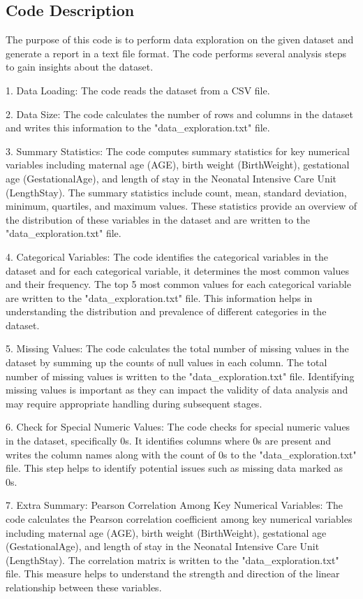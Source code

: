 \documentclass[11pt]{article}
\begin{document}
\subsection{Code Description}

The purpose of this code is to perform data exploration on the given dataset and generate a report in a text file format. The code performs several analysis steps to gain insights about the dataset.

1. Data Loading: The code reads the dataset from a CSV file.

2. Data Size: The code calculates the number of rows and columns in the dataset and writes this information to the "data\_exploration.txt" file.

3. Summary Statistics: The code computes summary statistics for key numerical variables including maternal age (AGE), birth weight (BirthWeight), gestational age (GestationalAge), and length of stay in the Neonatal Intensive Care Unit (LengthStay). The summary statistics include count, mean, standard deviation, minimum, quartiles, and maximum values. These statistics provide an overview of the distribution of these variables in the dataset and are written to the "data\_exploration.txt" file.

4. Categorical Variables: The code identifies the categorical variables in the dataset and for each categorical variable, it determines the most common values and their frequency. The top 5 most common values for each categorical variable are written to the "data\_exploration.txt" file. This information helps in understanding the distribution and prevalence of different categories in the dataset.

5. Missing Values: The code calculates the total number of missing values in the dataset by summing up the counts of null values in each column. The total number of missing values is written to the "data\_exploration.txt" file. Identifying missing values is important as they can impact the validity of data analysis and may require appropriate handling during subsequent stages.

6. Check for Special Numeric Values: The code checks for special numeric values in the dataset, specifically 0s. It identifies columns where 0s are present and writes the column names along with the count of 0s to the "data\_exploration.txt" file. This step helps to identify potential issues such as missing data marked as 0s.

7. Extra Summary: Pearson Correlation Among Key Numerical Variables: The code calculates the Pearson correlation coefficient among key numerical variables including maternal age (AGE), birth weight (BirthWeight), gestational age (GestationalAge), and length of stay in the Neonatal Intensive Care Unit (LengthStay). The correlation matrix is written to the "data\_exploration.txt" file. This measure helps to understand the strength and direction of the linear relationship between these variables.
\end{document}

